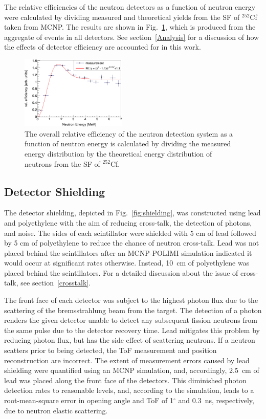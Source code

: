 \documentclass[%
 reprint,
 amsmath,amssymb,
 aps,
 nofootinbib
]{revtex4-1}
\begin{document}
The relative efficiencies of the neutron detectors as a function of neutron energy were calculated by dividing measured and theoretical yields from the SF of $^{252}$Cf taken from MCNP.
The results are shown in Fig.~\ref{fig:RelErgEfficiency}, which is produced from the aggregate of events in all detectors.
See section~\ref{Analysis} for a discussion of how the effects of detector efficiency are accounted for in this work.
\begin{figure}[]
    \centering
    \includegraphics[width = 0.45\textwidth]{RelErgEfficiency.png}
    \caption{The overall relative efficiency of the neutron detection system as a function of neutron energy is calculated by dividing the measured energy distribution by the theoretical energy distribution of neutrons from the SF of $^{252}$Cf.}
    \label{fig:RelErgEfficiency}
\end{figure}

\subsection{Detector Shielding}
\label{shielding}
The detector shielding, depicted in Fig.~\ref{fig:shielding}, was constructed using lead and polyethylene with the aim of reducing cross-talk, the detection of photons, and noise.
The sides of each scintillator were shielded with 5 cm of lead followed by 5 cm of polyethylene to reduce the chance of neutron cross-talk.
Lead was not placed behind the scintillators after an MCNP-POLIMI simulation indicated it would occur at significant rates otherwise.
Instead, 10~cm of polyethylene was placed behind the scintillators.
For a detailed discussion about the issue of cross-talk, see section~\ref{crosstalk}.

The front face of each detector was subject to the highest photon flux due to the scattering of the bremsstrahlung beam from the target.
The detection of a photon renders the given detector unable to detect any subsequent fission neutrons from the same pulse due to the detector recovery time.
Lead mitigates this problem by reducing photon flux, but has the side effect of scattering neutrons.
If a neutron scatters prior to being detected, the ToF measurement and position reconstruction are incorrect.
The extent of measurement errors caused by lead shielding were quantified using an MCNP simulation, and, accordingly, 2.5~cm of lead was placed along the front face of the detectors.
This diminished photon detection rates to reasonable levels, and, according to the simulation, leads to a root-mean-square error in opening angle and ToF of 1$^{\circ}$ and 0.3~ns, respectively, due to neutron elastic scattering.
\end{document}
